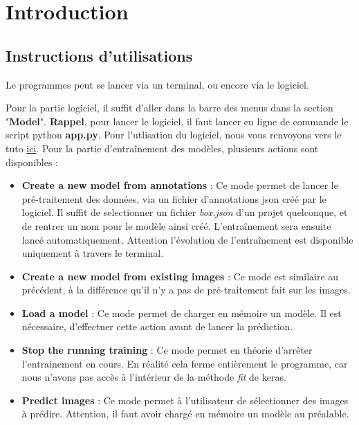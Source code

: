 \documentclass{rapport}
\begin{document}
    \section{Introduction}
    
        \subsection{Instructions d'utilisations}
            
            Le programmes peut se lancer via un terminal, ou encore via le logiciel.
            
            Pour la partie logiciel, il suffit d'aller dans la barre des menus dans la section "\textbf{Model}". \textbf{Rappel}, pour lancer le logiciel, il faut lancer en ligne de commande le script python \textbf{app.py}. Pour l'utlisation du logiciel, nous vous renvoyons vers le tuto \href{https://github.com/Brotherta/Facial-Mask-Recognition/blob/main/README.md}{ici}. Pour la partie d'entraînement des modèles, plusieurs actions sont disponibles :
            
            \begin{itemize}
                \item  \textbf{Create a new model from annotations} : Ce mode permet de lancer le pré-traitement des données, via un  fichier d'annotations json créé par le logiciel. Il suffit de selectionner un fichier \textit{box.json} d'un projet quelconque, et de rentrer un nom pour le modèle ainsi créé. L'entraînement sera ensuite lancé automatiquement. Attention l'évolution de l'entraînement est disponible uniquement à travers le terminal.
                
                \item \textbf{Create a new model from existing images} : Ce mode est similaire au précédent, à la différence qu'il n'y a pas de pré-traitement fait sur les images.
                
                \item \textbf{Load a model} : Ce mode permet de charger en mémoire un modèle. Il est nécessaire, d'effectuer cette action avant de lancer la prédiction.
                
                \item \textbf{Stop the running training} : Ce mode permet en théorie d'arrêter l'entrainement en cours. En réalité cela ferme entièrement le programme, car nous n'avons pas accès à l'intérieur de la méthode \textit{fit} de keras.
                
                \item \textbf{Predict images} : Ce mode permet à l'utilisateur de sélectionner des images à prédire. Attention, il faut avoir chargé en mémoire un modèle au préalable.
                
            \end{itemize}
            
\end{document}
